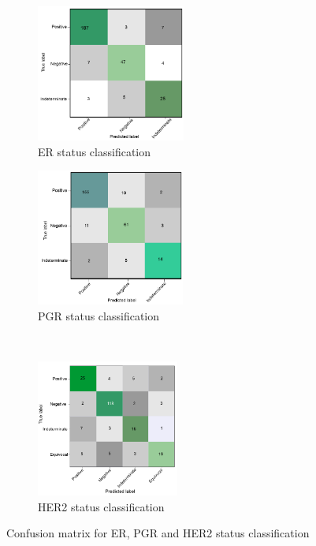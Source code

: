 \begin{figure}[h]
	\centering
	\begin{subfigure}{.49\linewidth}
		\centering
		\includegraphics[width=0.85\linewidth,height=45mm]{images/conf_er.png}
		\caption{ER status classification}
        \label{fig:er_confusion}
	\end{subfigure}
	\begin{subfigure}{.49\linewidth}
		\centering
		\includegraphics[width=0.85\linewidth,height=45mm]{images/conf_pgr.png}
		\caption{PGR status classification}
        \label{fig:pgr_confusion}
	\end{subfigure}\\[1ex]
	\begin{subfigure}{0.49\linewidth}
		\centering
		\includegraphics[width=0.85\linewidth,height=45mm]{images/conf_her2.png}
		\caption{HER2 status classification }
        \label{fig:her2_confusion}
	\end{subfigure}
	\caption{Confusion matrix for ER, PGR and HER2 status classification~\cite{karimACCESS2019}} 
	\label{fig:multi_cms}
\end{figure}

